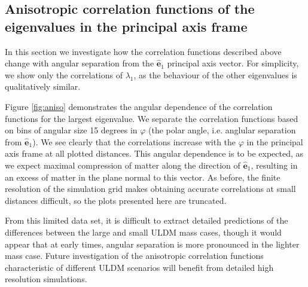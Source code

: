 \documentclass[a4paper,11pt]{article}
\begin{document}


\subsection{Anisotropic correlation functions of the eigenvalues in the principal axis frame}\label{sec:aniso}

In this section we investigate how the correlation functions described above change with angular separation from the $\hat{\mathbf{e}}_1$ principal axis vector. For simplicity, we show only the correlations of $\lambda_1$, as the behaviour of the other eigenvalues is qualitatively similar. 

Figure \ref{fig:aniso} demonstrates the angular dependence of the correlation functions for the largest eigenvalue. We separate the correlation functions based on bins of angular size 15 degrees in $\varphi$ (the polar angle, i.e. anglular separation from $\hat{\mathbf{e}}_1$). We see clearly that the correlations increase with the $\varphi$ in the principal axis frame at all plotted distances. This angular dependence is to be expected, as we expect maximal compression of matter along the direction of $\hat{\mathbf{e}}_1$, resulting in an excess of matter in the plane normal to this vector. As before, the finite resolution of the simulation grid makes obtaining accurate correlations at small distances difficult, so the plots presented here are truncated. 

From this limited data set, it is difficult to extract detailed predictions of the differences between the large and small ULDM mass cases, though it would appear that at early times, angular separation is more pronounced in the lighter mass case. Future investigation of the anisotropic correlation functions characteristic of different ULDM scenarios will benefit from detailed high resolution simulations.
\end{document}
